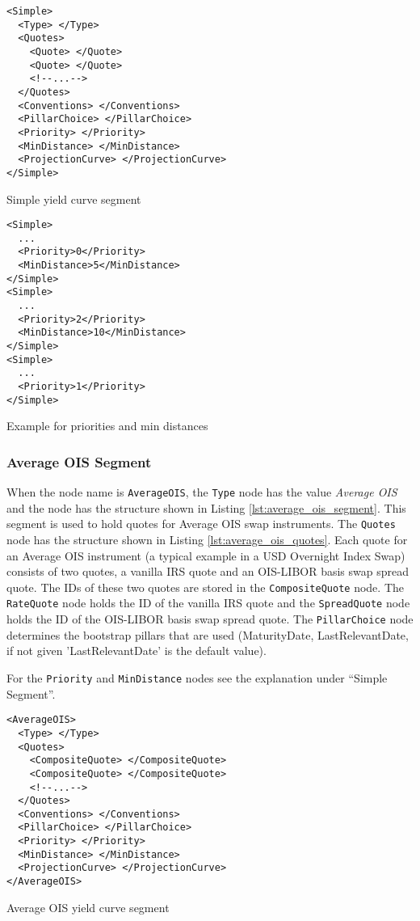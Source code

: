 \begin{listing}[H]
\begin{verbatim}
<Simple>
  <Type> </Type>
  <Quotes>
    <Quote> </Quote>
    <Quote> </Quote>
    <!--...-->
  </Quotes>
  <Conventions> </Conventions>
  <PillarChoice> </PillarChoice>
  <Priority> </Priority>
  <MinDistance> </MinDistance>
  <ProjectionCurve> </ProjectionCurve>
</Simple>
\end{verbatim}
\caption{Simple yield curve segment}
\label{lst:simple_segment}
\end{listing}

\begin{listing}[H]
\begin{verbatim}
<Simple>
  ...
  <Priority>0</Priority>
  <MinDistance>5</MinDistance>
</Simple>
<Simple>
  ...
  <Priority>2</Priority>
  <MinDistance>10</MinDistance>
</Simple>
<Simple>
  ...
  <Priority>1</Priority>
</Simple>
\end{verbatim}
\caption{Example for priorities and min distances}
\label{lst:priorities_min_distances}
\end{listing}

\subsubsection*{Average OIS Segment}
When the node name is \lstinline!AverageOIS!, the \lstinline!Type! node has the value \emph{Average OIS} and the node
has the structure shown in Listing \ref{lst:average_ois_segment}. This segment is used to hold quotes for Average OIS
swap instruments. The \lstinline!Quotes! node has the structure shown in Listing \ref{lst:average_ois_quotes}. Each
quote for an Average OIS instrument (a typical example in a USD Overnight Index Swap) consists of two quotes, a vanilla
IRS quote and an OIS-LIBOR basis swap spread quote.  The IDs of these two quotes are stored in the
\lstinline!CompositeQuote! node. The \lstinline!RateQuote! node holds the ID of the vanilla IRS quote and the
\lstinline!SpreadQuote! node holds the ID of the OIS-LIBOR basis swap spread quote. The \lstinline!PillarChoice! node
determines the bootstrap pillars that are used (MaturityDate, LastRelevantDate, if not given 'LastRelevantDate' is the
default value).

For the \lstinline!Priority! and \lstinline!MinDistance! nodes see the explanation under ``Simple Segment''.

\begin{listing}[H]
\begin{verbatim}
<AverageOIS>
  <Type> </Type>
  <Quotes>
    <CompositeQuote> </CompositeQuote>
    <CompositeQuote> </CompositeQuote>
    <!--...-->
  </Quotes>
  <Conventions> </Conventions>
  <PillarChoice> </PillarChoice>
  <Priority> </Priority>
  <MinDistance> </MinDistance>
  <ProjectionCurve> </ProjectionCurve>
</AverageOIS>
\end{verbatim}
\caption{Average OIS yield curve segment}
\label{lst:average_ois_segment}
\end{listing}

